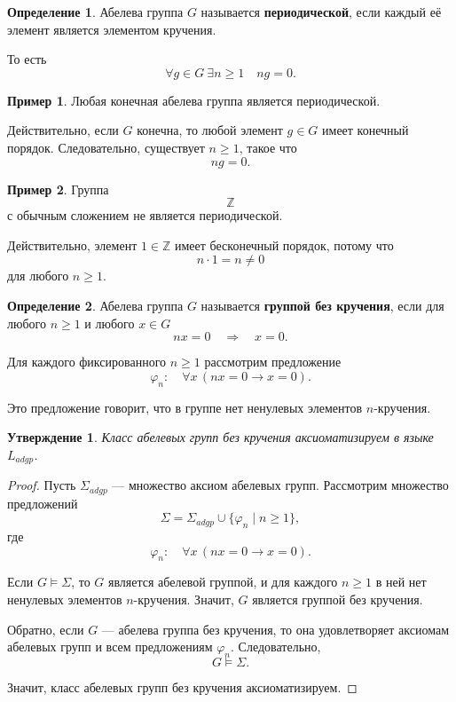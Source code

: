 \documentclass[12pt,a4paper,oneside,openany]{book}
\theoremstyle{definition}
\newtheorem{definition}{Определение}[chapter]
\newtheorem{example}{Пример}[chapter]
\theoremstyle{plain}
\newtheorem{proposition}{Утверждение}[chapter]
\theoremstyle{remark}
\begin{document}
\begin{definition}
Абелева группа \(G\) называется \textbf{периодической}, если каждый её элемент является элементом кручения.

То есть
\[
\forall g\in G\ \exists n\ge 1\quad ng=0.
\]
\end{definition}

\begin{example}
Любая конечная абелева группа является периодической.

Действительно, если \(G\) конечна, то любой элемент \(g\in G\) имеет конечный порядок. Следовательно, существует \(n\ge 1\), такое что
\[
ng=0.
\]
\end{example}

\begin{example}
Группа
\[
\mathbb Z
\]
с обычным сложением не является периодической.

Действительно, элемент \(1\in\mathbb Z\) имеет бесконечный порядок, потому что
\[
n\cdot 1=n\ne 0
\]
для любого \(n\ge 1\).
\end{example}


\begin{definition}
Абелева группа \(G\) называется \textbf{группой без кручения}, если для любого \(n\ge 1\) и любого \(x\in G\)
\[
nx=0
\quad\Longrightarrow\quad
x=0.
\]
\end{definition}

Для каждого фиксированного \(n\ge 1\) рассмотрим предложение
\[
\varphi_n:
\quad
\forall x\,(nx=0\to x=0).
\]

Это предложение говорит, что в группе нет ненулевых элементов \(n\)-кручения.

\begin{proposition}
Класс абелевых групп без кручения аксиоматизируем в языке \(L_{adgp}\).
\end{proposition}

\begin{proof}
Пусть \(\Sigma_{adgp}\) — множество аксиом абелевых групп. Рассмотрим множество предложений
\[
\Sigma
=
\Sigma_{adgp}\cup\{\varphi_n\mid n\ge 1\},
\]
где
\[
\varphi_n:
\quad
\forall x\,(nx=0\to x=0).
\]

Если \(G\models\Sigma\), то \(G\) является абелевой группой, и для каждого \(n\ge 1\) в ней нет ненулевых элементов \(n\)-кручения. Значит, \(G\) является группой без кручения.

Обратно, если \(G\) — абелева группа без кручения, то она удовлетворяет аксиомам абелевых групп и всем предложениям \(\varphi_n\). Следовательно,
\[
G\models\Sigma.
\]

Значит, класс абелевых групп без кручения аксиоматизируем.
\end{proof}
\end{document}
